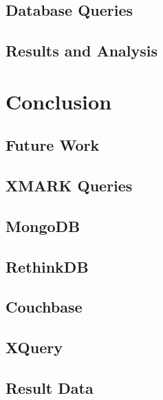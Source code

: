 \documentclass[a4paper,12pt]{book}
\begin{document}
    \section{Database Queries}
        
    \section{Results and Analysis}
        
	\chapter{Conclusion}\label{conc} 
	    
	\section{Future Work}\label{s.future}
	    
	\begin{appendices}
	   	\chapter{XMARK Queries}\label{appendices-queries}
    	   	\section{MongoDB}\label{mongodb-query-list}
    			
    		\section{RethinkDB}\label{rethinkdb-query-list}
    				
    		\section{Couchbase}\label{couchbase-query-list}
    				
    		\newpage		
    		\section{XQuery}
    	   	    
    	   	\newpage    
		    \section{Result Data}
								
	\end{appendices}
\end{document}
